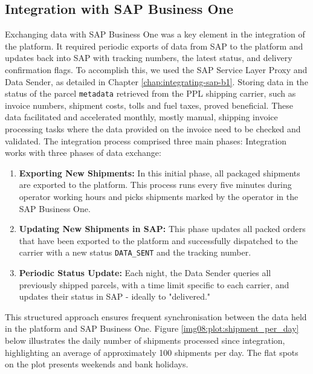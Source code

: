 \subsection{Integration with SAP Business One}
\label{subsec:integration-with-sap}
Exchanging data with SAP Business One was a key element in the integration of the platform.
It required periodic exports of data from SAP to the platform and updates back into SAP with tracking numbers, the latest status, and delivery confirmation flags. 
To accomplish this, we used the SAP Service Layer Proxy and Data Sender, as detailed in Chapter \ref{chap:integrating-sap-b1}.
Storing data in the status of the parcel \texttt{metadata} retrieved from the PPL shipping carrier, such as invoice numbers, shipment costs, tolls and fuel taxes, proved beneficial. 
These data facilitated and accelerated monthly, mostly manual, shipping invoice processing tasks where the data provided on the invoice need to be checked and validated.
The integration process comprised three main phases:
Integration works with three phases of data exchange:
\begin{enumerate}
    \item \textbf{Exporting New Shipments:} In this initial phase, all packaged shipments are exported to the platform. This process runs every five minutes during operator working hours and picks shipments marked by the operator in the SAP Business One.
    \item \textbf{Updating New Shipments in SAP:} This phase updates all packed orders that have been exported to the platform and successfully dispatched to the carrier with a new status \texttt{DATA\_SENT} and the tracking number.
    \item \textbf{Periodic Status Update:} Each night, the Data Sender queries all previously shipped parcels, with a time limit specific to each carrier, and updates their status in SAP - ideally to "delivered."
\end{enumerate}
This structured approach ensures frequent synchronisation between the data held in the platform and SAP Business One.
Figure \ref{img08:plot:shipment_per_day} below illustrates the daily number of shipments processed since integration, highlighting an average of approximately 100 shipments per day.
The flat spots on the plot presents weekends and bank holidays.
